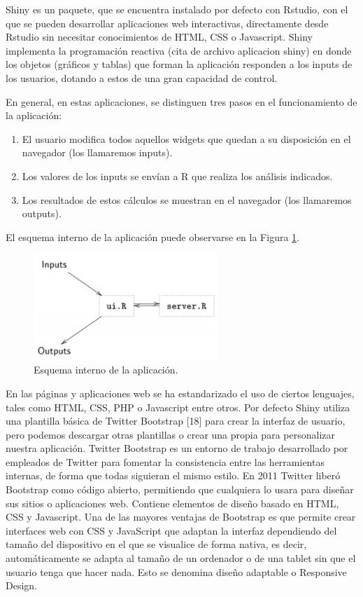Shiny es un paquete, que se encuentra instalado por defecto con Rstudio, con el que se pueden desarrollar aplicaciones web interactivas, directamente desde Rstudio sin necesitar conocimientos de HTML, CSS o Javascript. Shiny implementa la programación reactiva (cita de archivo aplicacion shiny) en donde los objetos (gráficos y tablas) que forman la aplicación responden a los inputs de los usuarios, dotando a estos de una gran capacidad de control.

En general, en estas aplicaciones, se distinguen tres pasos en el funcionamiento de la aplicación:
\begin{enumerate}
\item El usuario modifica todos aquellos widgets que quedan a su disposición en el navegador (los llamaremos inputs).
\item Los valores de los inputs se envían a R que realiza los análisis indicados.
\item Los resultados de estos cálculos se muestran en el navegador (los llamaremos outputs).
\end{enumerate}

El esquema interno de la aplicación puede observarse en la Figura \ref{fig:fig321}. 

\begin{figure}[h]
\begin{center}
\includegraphics[width=7cm]{./Graficos/figura7}
\end{center}
\caption{Esquema interno de la aplicación.}
\label{fig:fig321}
\end{figure}


En las páginas y aplicaciones web se ha estandarizado el uso de ciertos lenguajes, tales como HTML, CSS, PHP o Javascript entre otros. Por defecto Shiny utiliza una plantilla básica de Twitter Bootstrap [18] para crear la interfaz de usuario, pero podemos descargar otras plantillas o crear una propia para personalizar nuestra aplicación. Twitter Bootstrap es un entorno de trabajo desarrollado por empleados de Twitter para fomentar la consistencia entre las herramientas internas, de forma que todas siguieran el mismo estilo. En 2011 Twitter liberó Bootstrap como código abierto, permitiendo que cualquiera lo usara para diseñar sus sitios o aplicaciones web. Contiene elementos de diseño basado en HTML, CSS y Javascript. Una de las mayores ventajas de Bootstrap es que permite crear interfaces web con CSS y JavaScript que adaptan la interfaz dependiendo del tamaño del dispositivo en el que se visualice de forma nativa, es decir, automáticamente se adapta al tamaño de un ordenador o de una tablet sin que el usuario tenga que hacer nada. Esto se denomina diseño adaptable o Responsive Design.

